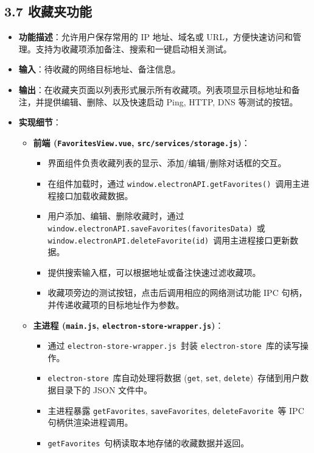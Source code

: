\documentclass{article}
\begin{document}
\subsection*{3.7 收藏夹功能}

\begin{itemize}
    \item \textbf{功能描述}：允许用户保存常用的 IP 地址、域名或 URL，方便快速访问和管理。支持为收藏项添加备注、搜索和一键启动相关测试。
    \item \textbf{输入}：待收藏的网络目标地址、备注信息。
    \item \textbf{输出}：在收藏夹页面以列表形式展示所有收藏项。列表项显示目标地址和备注，并提供编辑、删除、以及快速启动 Ping, HTTP, DNS 等测试的按钮。
    \item \textbf{实现细节}：
    \begin{itemize}
        \item \textbf{前端 (\texttt{FavoritesView.vue}, \texttt{src/services/storage.js})}：
        \begin{itemize}
            \item 界面组件负责收藏列表的显示、添加/编辑/删除对话框的交互。
            \item 在组件加载时，通过 \texttt{window.electronAPI.getFavorites()}\ 调用主进程接口加载收藏数据。
            \item 用户添加、编辑、删除收藏时，通过 \texttt{window.electronAPI.saveFavorites(favoritesData)}\ 或 \texttt{window.electronAPI.deleteFavorite(id)}\ 调用主进程接口更新数据。
            \item 提供搜索输入框，可以根据地址或备注快速过滤收藏项。
            \item 收藏项旁边的测试按钮，点击后调用相应的网络测试功能 IPC 句柄，并传递收藏项的目标地址作为参数。
        \end{itemize}
        \item \textbf{主进程 (\texttt{main.js}, \texttt{electron-store-wrapper.js})}：
        \begin{itemize}
            \item 通过 \texttt{electron-store-wrapper.js}\ 封装 \texttt{electron-store}\ 库的读写操作。
            \item \texttt{electron-store}\ 库自动处理将数据 (\texttt{get}, \texttt{set}, \texttt{delete})\ 存储到用户数据目录下的 JSON 文件中。
            \item 主进程暴露 \texttt{getFavorites}, \texttt{saveFavorites}, \texttt{deleteFavorite}\ 等 IPC 句柄供渲染进程调用。
            \item \texttt{getFavorites}\ 句柄读取本地存储的收藏数据并返回。

\end{itemize}
\end{itemize}
\end{itemize}
\end{document}

